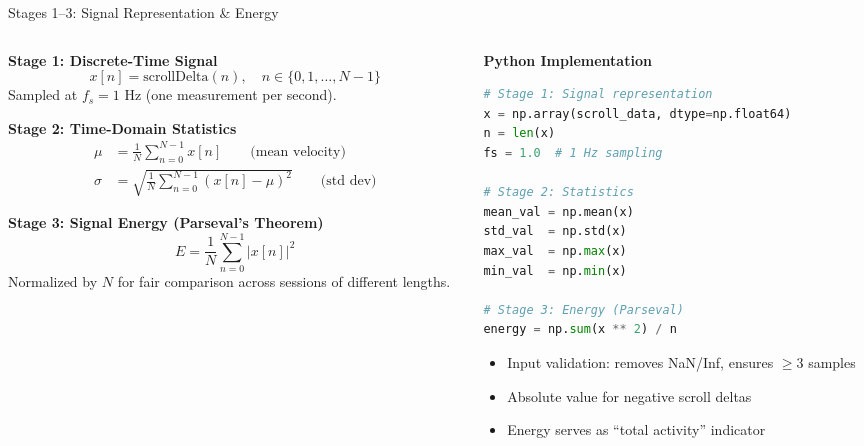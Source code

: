 \documentclass[aspectratio=169,10pt]{beamer}
\begin{document}
\begin{frame}{Stages 1--3: Signal Representation \& Energy}
\begin{columns}[T]
\begin{column}{0.48\textwidth}
\textbf{Stage 1: Discrete-Time Signal}
\begin{equation*}
x[n] = \text{scrollDelta}(n), \quad n \in \{0, 1, \ldots, N{-}1\}
\end{equation*}
\vspace{-6pt}
\footnotesize Sampled at $f_s = 1$ Hz (one measurement per second).

\vspace{8pt}
\textbf{Stage 2: Time-Domain Statistics}
\begin{align*}
\mu &= \frac{1}{N}\sum_{n=0}^{N-1} x[n] \qquad \text{(mean velocity)}\\[3pt]
\sigma &= \sqrt{\frac{1}{N}\sum_{n=0}^{N-1} (x[n] - \mu)^2} \qquad \text{(std dev)}
\end{align*}

\vspace{4pt}
\textbf{Stage 3: Signal Energy (Parseval's Theorem)}
\begin{equation*}
\boxed{E = \frac{1}{N}\sum_{n=0}^{N-1} |x[n]|^2}
\end{equation*}
\vspace{-4pt}
\footnotesize Normalized by $N$ for fair comparison across sessions of different lengths.
\end{column}

\begin{column}{0.48\textwidth}
\textbf{Python Implementation}
\begin{lstlisting}[language=Python]
# Stage 1: Signal representation
x = np.array(scroll_data, dtype=np.float64)
n = len(x)
fs = 1.0  # 1 Hz sampling

# Stage 2: Statistics
mean_val = np.mean(x)
std_val  = np.std(x)
max_val  = np.max(x)
min_val  = np.min(x)

# Stage 3: Energy (Parseval)
energy = np.sum(x ** 2) / n
\end{lstlisting}

\vspace{4pt}
\footnotesize
\begin{itemize}\scriptsize
  \item Input validation: removes NaN/Inf, ensures $\geq 3$ samples
  \item Absolute value for negative scroll deltas
  \item Energy serves as ``total activity'' indicator
\end{itemize}
\end{column}
\end{columns}
\end{frame}
\end{document}
